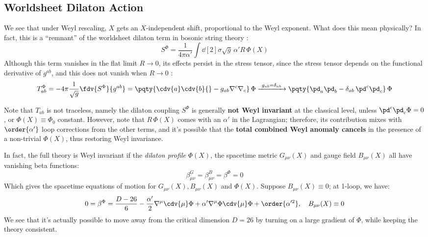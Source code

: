 \documentclass[a4paper
	,10pt
]{article}
\begin{document}
\subsection{Worldsheet Dilaton Action}
	We see that under Weyl rescaling, $X$ gets an $X$-independent shift, proportional to the Weyl exponent. What does this mean physically? In fact, this is a ``remnant'' of the worldsheet dilaton term in bosonic string theory \cite{Polchinski:1998rq}:
	\begin{equation}
		S^\Phi = \frac{1}{4\pi\alpha'}
			\int \dd[2]{\sigma} \sqrt{g}\,
				\alpha' R\,\Phi(X)
	\end{equation}
	Although this term vanishes in the flat limit $R \to 0$, its effects persist in the stress tensor, since the stress tensor depends on the functional derivative of $g^{ab}$, and this does not vanish when $R \to 0$ \cite{Tong:2009np}:
	\begin{equation}
		T^\Phi_{ab}
		= -4\pi \frac{1}{\sqrt{g}} \fdv{S^\Phi}{g^{ab}}
		= \pqty{
				\cdv{a} \cdv{b} {}
				- g_{ab} \nabla^c \nabla_c
			}\,\Phi
		\xrightarrow{\ g_{ab} = \delta_{ab}\ }
		\pqty{
				\pd_a \pd_b
				- \delta_{ab}\, \pd^c \pd_c
			}\,\Phi
	\end{equation}
	
	Note that $T_{ab}$ is not traceless, namely the dilaton coupling $S^\Phi$ is generally \textbf{not Weyl invariant} at the classical level, unless $\pd^c \pd_c \Phi = 0$, or $\Phi(X) \equiv \Phi_0$ constant. 
	However, note that $R\,\Phi(X)$ comes with an $\alpha'$ in the Lagrangian; therefore, its contribution mixes with $\order{\alpha'}$ loop corrections from the other terms, and it's possible that the \textbf{total combined Weyl anomaly cancels} in the presence of a non-trivial $\Phi(X)$, thus restoring Weyl invariance. 
	
	In fact, the full theory is Weyl invariant if the \textit{dilaton profile} $\Phi(X)$, the spacetime metric $G_{\mu\nu}(X)$ and gauge field $B_{\mu\nu}(X)$ all have vanishing beta functions:
	\begin{equation}
		\beta^G_{\mu\nu}
		= \beta^B_{\mu\nu}
		= \beta^\Phi = 0
	\label{eq:beta_constraints}
	\end{equation}
	Which gives the spacetime equations of motion for $G_{\mu\nu}(X), B_{\mu\nu}(X)$ and $\Phi(X)$. 
	Suppose $B_{\mu\nu}(X) \equiv 0$; at 1-loop, we have:
	\begin{equation}
		0 = \beta^\Phi
		= \frac{D - 26}{6}
			- \frac{\alpha'}{2} \nabla^\mu \cdv{\mu} \Phi
			+ \alpha' \nabla^\mu \Phi \cdv{\mu} \Phi
			+ \order{\alpha'^2},
	\quad
		B_{\mu\nu}(X) \equiv 0
	\end{equation}
	We see that it's actually possible to move away from the critical dimension $D = 26$ by turning on a large gradient of $\Phi$, while keeping the theory consistent. 
	
\end{document}
